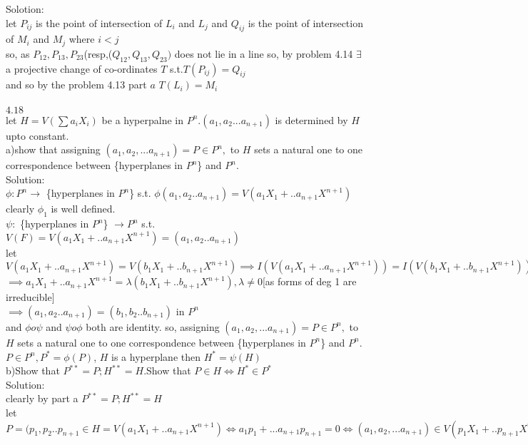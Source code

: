 \documentclass[11pt]{amsart}
\theoremstyle{definition}
\begin{document}
Solotion:\\
let $P_{ij}$ is the point of intersection of $L_i$ and $L_j$ and $Q_{ij}$ is the point of intersection of $M_i$ and $M_j$ where $i<j$\\
so, as $P_{12},P_{13},P_{23}$(resp,($Q_{12},Q_{13},Q_{23})$ does not lie in a line so, by problem 4.14  $\exists$ a projective change of co-ordinates $T$ s.t.$T(P_{ij})=Q_{ij}$\\
and so by the problem 4.13 part $a$ $T(L_i)=M_i$\\\\ 
$4.18$\\
let $H=V(\sum a_iX_i)$ be a hyperpalne in $P^n.(a_1,a_2...a_{n+1})$ is determined by $H$ upto constant.\\
a)show that assigning $(a_1,a_2,...a_{n+1})=P\in P^n,$ to $H$ sets a natural one to one correspondence between \{hyperplanes in $P^n$\} and $P^n$.\\
Solution:\\
$\phi:P^n\to $ \{hyperplanes in $P^n$\} s.t. $\phi(a_1,a_2..a_{n+1})=V(a_1X_1+..a_{n+1}X^{n+1})$\\
clearly $\phi_1$ is well defined.\\
$\psi:$ \{hyperplanes in $P^n$\} $\to P^n$ s.t.
$V(F)=V(a_1X_1+..a_{n+1}X^{n+1})=(a_1,a_2..a_{n+1})$\\
let $V(a_1X_1+..a_{n+1}X^{n+1})=V(b_1X_1+..b_{n+1}X^{n+1}) \implies I(V(a_1X_1+..a_{n+1}X^{n+1}))=I(V(b_1X_1+..b_{n+1}X^{n+1}))$\\
$\implies a_1X_1+..a_{n+1}X^{n+1}=\lambda(b_1X_1+..b_{n+1}X^{n+1}),\lambda\neq 0$[as forms of deg 1 are irreducible]\\
$\implies (a_1,a_2..a_{n+1})=(b_1,b_2..b_{n+1}) $ in $P^n$\\
and $\phi o \psi$ and $\psi o \phi$ both are identity.
so, assigning $(a_1,a_2,...a_{n+1})=P\in P^n,$ to $H$ sets a natural one to one correspondence between \{hyperplanes in $P^n$\} and $P^n$.\\
$P\in P^{n},P^*=\phi(P)$, $H$ is a hyperplane then $H^*=\psi(H)$\\
b)Show that $P^{**}=P;H^{**}=H$.Show that $P\in H\iff H^{*}\in P^{*}$\\
Solution:\\
clearly by part a  $P^{**}=P;H^{**}=H$\\
let $P=(p_1,p_2..p_{n+1}\in H=V(a_1X_1+..a_{n+1}X^{n+1})\iff a_1p_1+...a_{n+1}p_{n+1}=0\iff (a_1,a_2,...a_{n+1})\in V(p_1X_1+..p_{n+1}X^{n+1})\iff H^{*}\in P^{*}$\\
\end{document}
